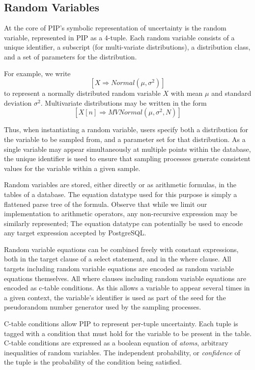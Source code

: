 \subsection{Random Variables}

At the core of PIP's symbolic representation of uncertainty is the random variable, represented in PIP as a 4-tuple.  Each random variable consists of a unique identifier, a subscript (for multi-variate distributions), a distribution class, and a set of parameters for the distribution.  

For example, we write 
$$[X\Rightarrow Normal(\mu,\sigma^2)]$$
 to represent a normally distributed random variable $X$ with mean $\mu$ and standard deviation $\sigma^2$.  Multivariate distributions may be written in the form 
$$[X[n]\Rightarrow MVNormal(\mu, \sigma^2, N)]$$

Thus, when instantiating a random variable, users specify both a distribution for the variable to be sampled from, and a parameter set for that distribution.  As a single variable may appear simultaneously at multiple points within the database, the unique identifier is used to ensure that sampling processes generate consistent values for the variable within a given sample.  

Random variables are stored, either directly or as arithmetic formulas, in the tables of a database.  The equation datatype used for this purpose is simply a flattened parse tree of the formula.  Observe that while we limit our implementation to arithmetic operators, any non-recursive expression may be similarly represented; The equation datatype can potentially be used to encode any target expression accepted by PostgreSQL.  

Random variable equations can be combined freely with constant expressions, both in the target clause of a select statement, and in the where clause.  All targets including random variable equations are encoded as random variable equations themselves.  All where clauses including random variable equations are encoded as c-table conditions.  As this allows a variable to appear several times in a given context, the variable's identifier is used as part of the seed for the pseudorandom number generator used by the sampling processes.

C-table conditions allow PIP to represent per-tuple uncertainty.  Each tuple is tagged with a condition that must hold for the variable to be present in the table.  C-table conditions are expressed as a boolean equation of \textit{atoms}, arbitrary inequalities of random variables.  The independent probability, or \textit{confidence} of the tuple is the probability of the condition being satisfied.  

